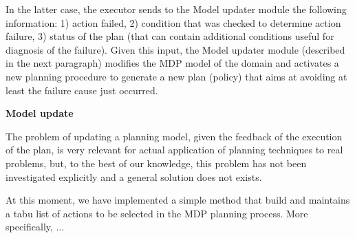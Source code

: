 In the latter case, the executor sends to the Model updater module the following information:
1) action failed, 2) condition that was checked to determine action failure, 3) status of the plan (that can contain additional conditions useful for diagnosis of the failure).
Given this input, the Model updater module (described in the next paragraph) modifies the MDP model of the domain and activates a new planning procedure to generate a new plan (policy) that aims at avoiding at least the failure cause just occurred.


\noindent
{\bf Model update}

The problem of updating a planning model, given the feedback of the execution of the plan, is very relevant for actual application of planning techniques to real problems, but, to the best of our knowledge, this problem has not been investigated explicitly and a general solution does not exists.

At this moment, we have implemented a simple method that build and maintains a tabu list of actions to be selected in the MDP planning process.
More specifically, ...






